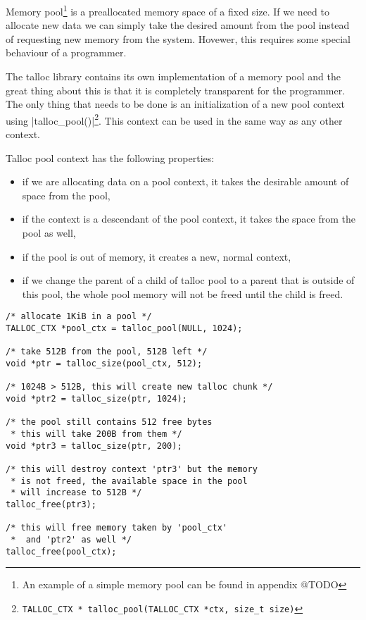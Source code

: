 Memory pool\footnote{An example of a simple memory pool can be found in appendix
@TODO} is a preallocated memory space of a fixed size. If we need to allocate
new data we can simply take the desired amount from the pool instead of
requesting new memory from the system. Hovewer, this requires some special
behaviour of a programmer.

The talloc library contains its own implementation of a memory pool and the
great thing about this is that it is completely transparent for the programmer.
The only thing that needs to be done is an initialization of a new pool context
using |talloc_pool()|\footnote{\lstinline{TALLOC_CTX *
talloc_pool(TALLOC_CTX *ctx, size_t size)}}. This context can be used in the
same way as any other context.

Talloc pool context has the following properties:

\begin{itemize}
  \item if we are allocating data on a pool context, it takes the desirable
  amount of space from the pool,
  \item if the context is a descendant of the pool context, it takes the space
  from the pool as well,
  \item if the pool is out of memory, it creates a new, normal context,
  \item if we change the parent of a child of talloc pool to a parent that is
  outside of this pool, the whole pool memory will not be freed until the child
  is freed.
\end{itemize}

\begin{lstlisting}[caption={Talloc pool},label=lst:talloc_pool]
/* allocate 1KiB in a pool */
TALLOC_CTX *pool_ctx = talloc_pool(NULL, 1024);

/* take 512B from the pool, 512B left */
void *ptr = talloc_size(pool_ctx, 512);

/* 1024B > 512B, this will create new talloc chunk */
void *ptr2 = talloc_size(ptr, 1024);

/* the pool still contains 512 free bytes
 * this will take 200B from them */
void *ptr3 = talloc_size(ptr, 200);

/* this will destroy context 'ptr3' but the memory
 * is not freed, the available space in the pool
 * will increase to 512B */
talloc_free(ptr3);

/* this will free memory taken by 'pool_ctx'
 *  and 'ptr2' as well */
talloc_free(pool_ctx);
\end{lstlisting}

